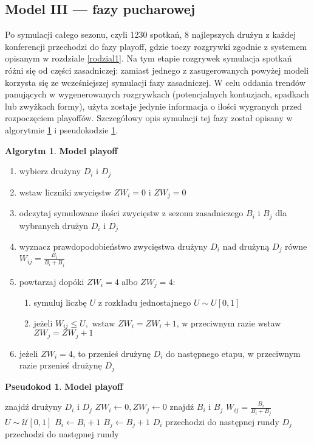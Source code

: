 \documentclass[inzynierska]{pwr_wmat_praca_dyplomowa}
\theoremstyle{plain}
\numberwithin{theorem}{chapter}
\theoremstyle{definition}
\numberwithin{theorem}{chapter}
\newtheorem{algorytm}[theorem]{Algorytm}
\newtheorem{pseudokod}[theorem]{Pseudokod}
\begin{document}
\subsection{Model III --- fazy pucharowej}
Po symulacji całego sezonu, czyli 1230 spotkań, 8 najlepszych drużyn z każdej konferencji przechodzi do fazy playoff, gdzie toczy rozgrywki zgodnie z systemem opisanym w rozdziale \ref{rodzial1}. Na tym etapie rozgrywek symulacja spotkań różni się od części zasadniczej: zamiast jednego z zasugerowanych powyżej modeli korzysta się ze wcześniejszej symulacji fazy zasadniczej. W celu oddania trendów panujących w wygenerowanych rozgrywkach (potencjalnych kontuzjach, spadkach lub zwyżkach formy), użyta zostaje jedynie informacja o ilości wygranych przed rozpoczęciem playoffów. Szczegółowy opis symulacji tej fazy został opisany w algorytmie \ref{algorytm3} i pseudokodzie \ref{pseudokod3}.

\begin{algorytm} \label{algorytm3}
	\textbf{Model playoff}
	\begin{enumerate}
		\item wybierz drużyny $D_i$ i $D_j$
		\item wstaw liczniki zwycięstw $ZW_i=0$ i $ZW_j=0$
		\item odczytaj symulowane ilości zwycięstw z sezonu zasadniczego $B_i$ i $B_j$ dla wybranych drużyn $D_i$ i $D_j$
		\item wyznacz prawdopodobieństwo zwycięstwa drużyny $D_i$ nad drużyną $D_j$ równe $W_{ij}=\frac{B_i}{B_i + B_j}$
		\item powtarzaj dopóki  $ZW_i=4$ albo $ZW_j=4$:
		\begin{enumerate}
			\item symuluj liczbę $U$ z rozkładu jednostajnego $U\sim U[0,1]$ 
			\item jeżeli $W_{ij} \leq U,$ wstaw $ZW_i=ZW_i+1$, w przeciwnym razie wstaw $ZW_j=ZW_j+1$
		\end{enumerate}
		\item jeżeli $ZW_i=4$, to przenieś drużynę $D_i$ do następnego etapu, w przeciwnym razie przenieś drużynę $D_j$
	\end{enumerate}
\end{algorytm} 

\begin{pseudokod} \label{pseudokod3} 
	\textbf{Model playoff}
	\begin{algorithmic}[1]
		\State znajdź drużyny $D_i$ i $D_j$
		\State $ZW_i\gets 0,ZW_j\gets 0$
		\State znajdź $B_{i}$ i $B_{j}$ 
		\State $W_{ij}=\frac{B_i}{B_i + B_j}$
		\State $U\sim \mathcal{U}[0,1]$
		\State $B_i \gets B_i+1$
		\Else
		\State $B_j \gets B_j+1$
		\EndIf
		\EndWhile
		\State $D_i$ przechodzi do następnej rundy
		\Else
		\State $D_j$ przechodzi do następnej rundy
		\EndIf
	\end{algorithmic}
\end{pseudokod}
\end{document}
